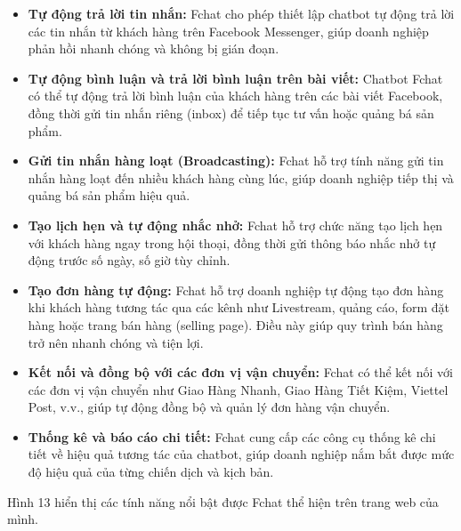 \begin{itemize}
    \item \textbf{Tự động trả lời tin nhắn:} Fchat cho phép thiết lập chatbot tự động trả lời các tin nhắn từ khách hàng trên Facebook Messenger, giúp doanh nghiệp phản hồi nhanh chóng và không bị gián đoạn.
    
    \item \textbf{Tự động bình luận và trả lời bình luận trên bài viết:} Chatbot Fchat có thể tự động trả lời bình luận của khách hàng trên các bài viết Facebook, đồng thời gửi tin nhắn riêng (inbox) để tiếp tục tư vấn hoặc quảng bá sản phẩm.
    \item \textbf{Gửi tin nhắn hàng loạt (Broadcasting):} Fchat hỗ trợ tính năng gửi tin nhắn hàng loạt đến nhiều khách hàng cùng lúc, giúp doanh nghiệp tiếp thị và quảng bá sản phẩm hiệu quả.

    \item \textbf{Tạo lịch hẹn và tự động nhắc nhở:} Fchat hỗ trợ chức năng tạo lịch hẹn với khách hàng ngay trong hội thoại, đồng thời gửi thông báo nhắc nhở tự động trước số ngày, số giờ tùy chỉnh.

    \item \textbf{Tạo đơn hàng tự động:} Fchat hỗ trợ doanh nghiệp tự động tạo đơn hàng khi khách hàng tương tác qua các kênh như Livestream, quảng cáo, form đặt hàng hoặc trang bán hàng (selling page). Điều này giúp quy trình bán hàng trở nên nhanh chóng và tiện lợi.

    \item \textbf{Kết nối và đồng bộ với các đơn vị vận chuyển:} Fchat có thể kết nối với các đơn vị vận chuyển như Giao Hàng Nhanh, Giao Hàng Tiết Kiệm, Viettel Post, v.v., giúp tự động đồng bộ và quản lý đơn hàng vận chuyển.
    
    \item \textbf{Thống kê và báo cáo chi tiết:} Fchat cung cấp các công cụ thống kê chi tiết về hiệu quả tương tác của chatbot, giúp doanh nghiệp nắm bắt được mức độ hiệu quả của từng chiến dịch và kịch bản.
\end{itemize}

Hình 13 hiển thị các tính năng nổi bật được Fchat thể hiện trên trang web của mình.

